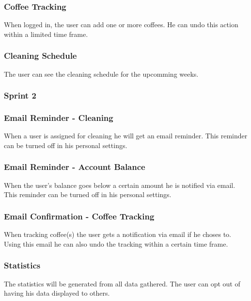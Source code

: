 \subsubsection*{Coffee Tracking}

When logged in, the user can add one or more coffees. He can undo this
action within a limited time frame.

\subsubsection*{Cleaning Schedule}

The user can see the cleaning schedule for the upcomming weeks.

\subsubsection{Sprint 2}\label{sprint-2}

\subsubsection*{Email Reminder - Cleaning}

When a user is assigned for cleaning he will get an email reminder. This
reminder can be turned off in his personal settings.

\subsubsection*{Email Reminder - Account Balance}

When the user's balance goes below a certain amount he is notified via
email. This reminder can be turned off in his personal settings.

\subsubsection*{Email Confirmation - Coffee Tracking}

When tracking coffee(s) the user gets a notification via email if he
choses to. Using this email he can also undo the tracking within a
certain time frame.

\subsubsection*{Statistics}

The statistics will be generated from all data gathered. The user can
opt out of having his data displayed to others.

